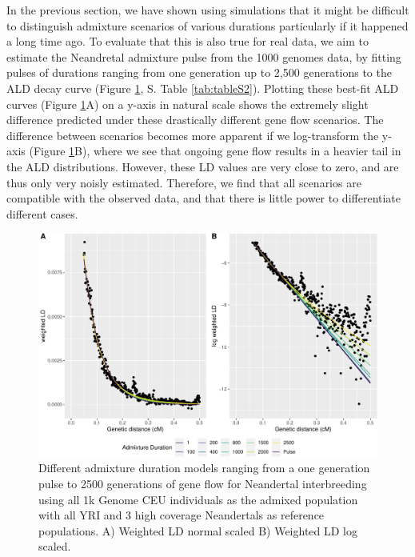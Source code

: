 \documentclass[]{article}
\begin{document}
In the previous section, we have shown using simulations that it might be difficult to distinguish admixture scenarios of various durations particularly if it happened a long time ago. To evaluate that this is also true for real data, we aim to estimate the Neandretal admixture pulse from the 1000 genomes data, by fitting pulses of durations ranging from one generation up to 2,500 generations to the ALD decay curve (Figure \ref{fig:fig5}, S. Table \ref{tab:tableS2}). Plotting these best-fit ALD curves (Figure \ref{fig:fig5}A) on a y-axis in natural scale shows the extremely slight difference predicted under these drastically different gene flow scenarios. The difference between scenarios becomes more apparent if we log-transform the y-axis (Figure \ref{fig:fig5}B), where we see that ongoing gene flow results in a heavier tail in the ALD distributions. However, these LD values are very close to zero, and are thus only very noisly estimated. Therefore, we find that all scenarios are compatible with the observed data, and that there is little power to differentiate different cases.




\begin{figure}
\centering
\includegraphics{Admixture_Time_Inference_Paper_Draft_files/figure-latex/fig5-1.pdf}
\caption{\label{fig:fig5} Different admixture duration models ranging
from a one generation pulse to 2500 generations of gene flow for Neandertal interbreeding using all 1k Genome CEU individuals as the admixed population
with all YRI and 3 high coverage Neandertals as reference populations. A) Weighted LD normal scaled B) Weighted LD log scaled.}
\end{figure}
\end{document}
